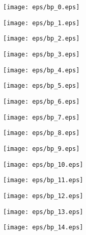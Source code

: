 \documentclass{book}
\begin{document}
\begin{figure}[p]
    \centering
	\texttt{[image: eps/bp\_0.eps]}
	\end{figure}
	\clearpage\begin{figure}[p]
    \centering
	\texttt{[image: eps/bp\_1.eps]}
	\end{figure}
	\clearpage\begin{figure}[p]
    \centering
	\texttt{[image: eps/bp\_2.eps]}
	\end{figure}
	\clearpage\begin{figure}[p]
    \centering
	\texttt{[image: eps/bp\_3.eps]}
	\end{figure}
	\clearpage\begin{figure}[p]
    \centering
	\texttt{[image: eps/bp\_4.eps]}
	\end{figure}
	\clearpage\begin{figure}[p]
    \centering
	\texttt{[image: eps/bp\_5.eps]}
	\end{figure}
	\clearpage\begin{figure}[p]
    \centering
	\texttt{[image: eps/bp\_6.eps]}
	\end{figure}
	\clearpage\begin{figure}[p]
    \centering
	\texttt{[image: eps/bp\_7.eps]}
	\end{figure}
	\clearpage\begin{figure}[p]
    \centering
	\texttt{[image: eps/bp\_8.eps]}
	\end{figure}
	\clearpage\begin{figure}[p]
    \centering
	\texttt{[image: eps/bp\_9.eps]}
	\end{figure}
	\clearpage\begin{figure}[p]
    \centering
	\texttt{[image: eps/bp\_10.eps]}
	\end{figure}
	\clearpage\begin{figure}[p]
    \centering
	\texttt{[image: eps/bp\_11.eps]}
	\end{figure}
	\clearpage\begin{figure}[p]
    \centering
	\texttt{[image: eps/bp\_12.eps]}
	\end{figure}
	\clearpage\begin{figure}[p]
    \centering
	\texttt{[image: eps/bp\_13.eps]}
	\end{figure}
	\clearpage\begin{figure}[p]
    \centering
	\texttt{[image: eps/bp\_14.eps]}
	\end{figure}
\end{document}
